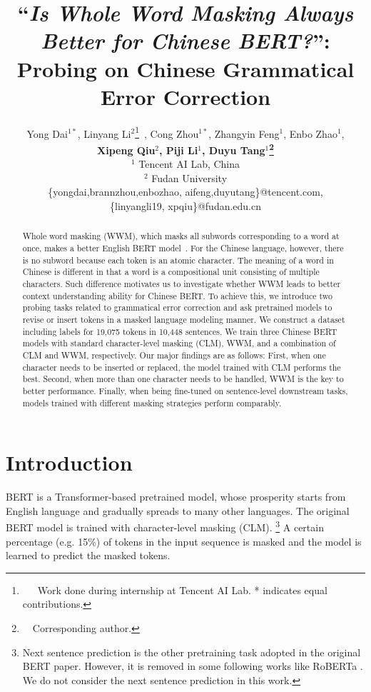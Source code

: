 \documentclass[11pt]{article}
\title{``\textit{Is Whole Word Masking Always Better for Chinese BERT?}'': 
\\Probing on Chinese Grammatical Error Correction}
\author{Yong Dai$^{1*}$, Linyang Li$^2$\thanks{\ \ \ Work done during internship at Tencent AI Lab. * indicates equal contributions. }\ , Cong Zhou$^{1*}$, Zhangyin Feng$^{1}$, Enbo Zhao$^1$,   \\\textbf{Xipeng Qiu$^2$, Piji Li$^1$, Duyu Tang$^1$\thanks{~~Corresponding author.}} \\
	$^1$ Tencent AI Lab, China\\
	$^2$ Fudan University \\
\{yongdai,brannzhou,enbozhao, aifeng,duyutang\}@tencent.com,  \\
\{linyangli19, xpqiu\}@fudan.edu.cn
}
\begin{document}
\maketitle
\begin{abstract}
Whole word masking (WWM), which masks all subwords corresponding to a word at once, makes a better English BERT model~\cite{sennrich-etal-2016-neural}. For the Chinese language, however, there is no subword because each token is an atomic character. The meaning of a word in Chinese is different in that a word is a compositional unit consisting of multiple characters. Such difference motivates us to investigate whether WWM leads to better context understanding ability for Chinese BERT. To achieve this, we introduce two probing tasks related to grammatical error correction and ask pretrained models to revise or insert tokens in a masked language modeling manner. We construct a dataset including labels for 19,075 tokens in 10,448 sentences. We train three Chinese BERT models with standard character-level masking (CLM), WWM, and a combination of CLM and WWM, respectively. Our major findings are as follows: First, when one character needs to be inserted or replaced, the model trained with CLM performs the best. Second, when more than one character needs to be handled, WWM is the key to better performance. Finally, when being fine-tuned on sentence-level downstream tasks, models trained with different masking strategies perform comparably.%


\end{abstract}

 \section{Introduction}
BERT \cite{devlin2018bert} is a Transformer-based pretrained model, whose prosperity starts from English language and gradually spreads to many other languages. 
The original BERT model is trained with character-level masking (CLM). \footnote{Next sentence prediction is the other pretraining task adopted in the original BERT paper. However, it is removed in some following works like RoBERTa \cite{liu2019roberta}. We do not consider the next sentence prediction in this work.} A certain percentage (e.g. 15\%) of tokens in the input sequence is masked and the model is learned to predict the masked tokens. 
\end{document}
